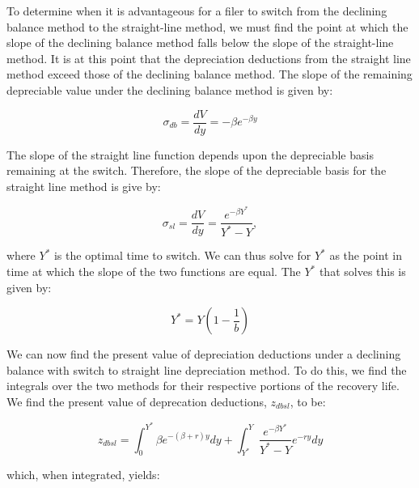 \documentclass[article,11pt,letterpaper,fleqn]{article}
\theoremstyle{definition}
\numberwithin{equation}{section}
\begin{document}
To determine when it is advantageous for a filer to switch from the declining balance method to the straight-line method, we must find the point at which the slope of the declining balance method falls below the slope of the straight-line method.  It is at this point that the depreciation deductions from the straight line method exceed those of the declining balance method.  The slope of the remaining depreciable value under the declining balance method is given by:


\begin{equation}
\sigma_{db} = \frac{dV}{dy}=-\beta e^{-\beta y}
\end{equation}

\noindent\noindent The slope of the straight line function depends upon the depreciable basis remaining at the switch.  Therefore, the slope of the depreciable basis for the straight line method is give by:

\begin{equation}
\sigma_{sl} =  \frac{dV}{dy}=\frac{e^{-\beta Y^{*}}}{Y^{*}-Y},
\end{equation}

\noindent\noindent where $Y^{*}$ is the optimal time to switch. We can thus solve for $Y^{*}$ as the point in time at which the slope of the two functions are equal.  The $Y^{*}$ that solves this is given by:

\begin{equation}
Y^{*}=Y\left(1-\frac{1}{b}\right)
\end{equation}

We can now find the present value of depreciation deductions under a declining balance with switch to straight line depreciation method.  To do this, we find the integrals over the two methods for their respective portions of the recovery life.  We find the present value of deprecation deductions, $z_{dbsl}$, to be:

\begin{equation}
z_{dbsl}=\int_{0}^{Y^{*}}\beta e^{-(\beta+r)y}dy+\int_{Y^{*}}^{Y}\frac{e^{-\beta Y^{*}}}{Y^{*}-Y}e^{-ry}dy
\end{equation}

\noindent\noindent which, when integrated, yields:
\end{document}
